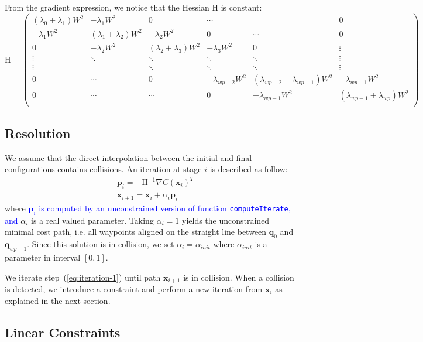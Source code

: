 \documentclass{tADR2e}
\newcommand\p{\mathbf{p}}
\newcommand\conf{\mathbf{q}}
\newcommand\xx{\mathbf{x}} %
\newcommand\cost{C}
\newcommand\weight{W}
\begin{document}
From the gradient expression, we notice that the Hessian $\mbox{H}$ is constant:
$$
\mbox{H} = \left(\begin{array}{cccccc}
(\lambda_{0}+\lambda_{1})\weight^2 & -\lambda_{1}\weight^2 & 0 & \cdots & & 0 \\
-\lambda_{1}\weight^2 & (\lambda_{1}+\lambda_{2})\weight^2 & -\lambda_{2}\weight^2 & 0 & \cdots & 0 \\
0 & -\lambda_{2}\weight^2 &  (\lambda_{2}+\lambda_{3})\weight^2 & -\lambda_{3}\weight^2 & 0 & \vdots \\
\vdots & \ddots & \ddots & \ddots & \ddots & \vdots\\
\vdots & & \ddots & \ddots & \ddots & \vdots\\
0 & \cdots  & 0 & -\lambda_{wp-2}\weight^2 & (\lambda_{wp-2}+\lambda_{wp-1})\weight^2 & -\lambda_{wp-1}\weight^2 \\
0 & \cdots &  \cdots & 0 & -\lambda_{wp-1}\weight^2 & (\lambda_{wp-1}+\lambda_{wp})\weight^2  \\
\end{array}\right)
$$

\subsection {Resolution}
We assume that the direct interpolation between the initial and final configurations contains collisions. An iteration at stage $i$ is described as follow:
\begin{equation}\label{eq:iteration-1}
\begin{split}
& \p_i =  -\mbox{H}^{-1} \nabla \cost(\xx_i)^{T} \\
& \xx_{i+1} =  \xx_{i} + \alpha_i \p_i
\end{split} 
\end{equation}
where \textcolor{blue}{$\p_i$ is computed by an unconstrained version of function \texttt{computeIterate}, and} $\alpha_i$ is a real valued parameter. Taking $\alpha_i=1$ yields the 
unconstrained minimal cost path, i.e. all waypoints aligned on the straight line 
between $\conf_0$ and $\conf_{wp+1}$. Since this solution is in collision, we set 
$\alpha_i = \alpha_{init}$
where $\alpha_{init}$ is a parameter in interval $[0,1]$.

We iterate step~(\ref{eq:iteration-1}) until path $\xx_{i+1}$ is in collision.
When a collision is detected, we introduce a constraint and perform a new 
iteration from $\xx_i$ as explained in the next section.

\subsection{Linear Constraints}
\end{document}
